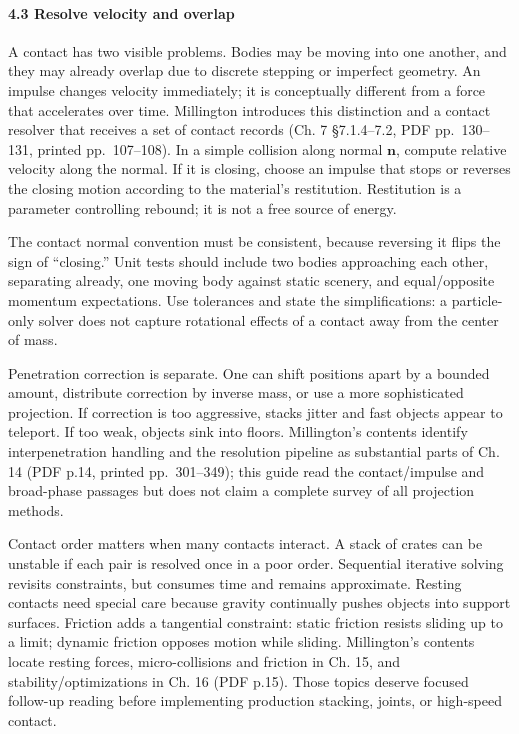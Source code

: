 \paragraph{4.3 Resolve velocity and overlap}\label{06-engine-ii-ch033-resolve-velocity-and-overlap}

A contact has two visible problems. Bodies may be moving into one another, and they may already overlap due to discrete stepping or imperfect geometry. An impulse changes velocity immediately; it is conceptually different from a force that accelerates over time. Millington introduces this distinction and a contact resolver that receives a set of contact records (Ch. 7 §7.1.4--7.2, PDF pp.~130--131, printed pp.~107--108). In a simple collision along normal \(\mathbf{n}\), compute relative velocity along the normal. If it is closing, choose an impulse that stops or reverses the closing motion according to the material's restitution. Restitution is a parameter controlling rebound; it is not a free source of energy.

The contact normal convention must be consistent, because reversing it flips the sign of ``closing.'' Unit tests should include two bodies approaching each other, separating already, one moving body against static scenery, and equal/opposite momentum expectations. Use tolerances and state the simplifications: a particle-only solver does not capture rotational effects of a contact away from the center of mass.

Penetration correction is separate. One can shift positions apart by a bounded amount, distribute correction by inverse mass, or use a more sophisticated projection. If correction is too aggressive, stacks jitter and fast objects appear to teleport. If too weak, objects sink into floors. Millington's contents identify interpenetration handling and the resolution pipeline as substantial parts of Ch. 14 (PDF p.14, printed pp.~301--349); this guide read the contact/impulse and broad-phase passages but does not claim a complete survey of all projection methods.

Contact order matters when many contacts interact. A stack of crates can be unstable if each pair is resolved once in a poor order. Sequential iterative solving revisits constraints, but consumes time and remains approximate. Resting contacts need special care because gravity continually pushes objects into support surfaces. Friction adds a tangential constraint: static friction resists sliding up to a limit; dynamic friction opposes motion while sliding. Millington's contents locate resting forces, micro-collisions and friction in Ch. 15, and stability/optimizations in Ch. 16 (PDF p.15). Those topics deserve focused follow-up reading before implementing production stacking, joints, or high-speed contact.

